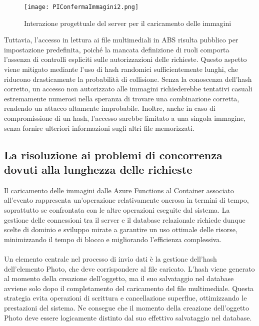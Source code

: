 \begin{figure}[h!]
    \centering
    \texttt{[image: PIConfermaImmagini2.png]}
    \caption{Interazione progettuale del server per il caricamento delle immagini }
\end{figure}

Tuttavia, l’accesso in lettura ai file multimediali in ABS risulta pubblico per impostazione predefinita, 
poiché la mancata definizione di ruoli comporta l’assenza di controlli espliciti sulle autorizzazioni delle richieste. 
Questo aspetto viene mitigato mediante l’uso di hash randomici sufficientemente lunghi, che riducono drasticamente la probabilità di collisione. 
Senza la conoscenza dell’hash corretto, un accesso non autorizzato alle immagini 
richiederebbe tentativi casuali estremamente numerosi nella speranza di trovare una combinazione corretta, rendendo un attacco altamente improbabile. 
Inoltre, anche in caso di compromissione di un hash, l’accesso sarebbe limitato a una singola immagine, senza fornire ulteriori informazioni sugli altri file memorizzati.

\clearpage

\subsection{La risoluzione ai problemi di concorrenza dovuti alla lunghezza delle richieste}

Il caricamento delle immagini dalle Azure Functions al Container associato all’evento rappresenta un'operazione relativamente onerosa in termini di tempo, 
soprattutto se confrontata con le altre operazioni eseguite dal sistema. 
La gestione delle connessioni tra il server e il database relazionale richiede dunque scelte di dominio e sviluppo mirate a garantire un uso ottimale delle risorse, 
minimizzando il tempo di blocco e migliorando l'efficienza complessiva.\\
\\
Un elemento centrale nel processo di invio dati è la gestione dell’hash dell’elemento Photo, che deve corrispondere al file caricato. 
L’hash viene generato al momento della creazione dell’oggetto, ma il suo salvataggio nel database avviene solo dopo il completamento del caricamento del file multimediale. 
Questa strategia evita operazioni di scrittura e cancellazione superflue, ottimizzando le prestazioni del sistema. 
Ne consegue che il momento della creazione dell’oggetto Photo deve essere logicamente distinto dal suo effettivo salvataggio nel database.

